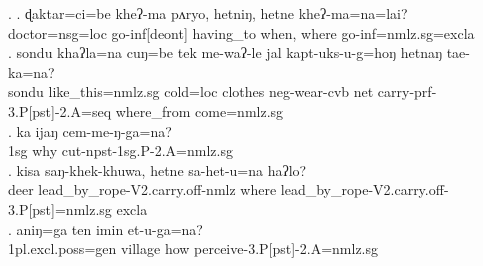  \ex. \ag. ɖaktar=ci=be       kheʔ-ma           pʌryo, hetniŋ,  hetne  kheʔ-ma=na=lai?\\
 doctor{\sc =nsg=loc} go{\sc -inf[deont]} having\_to when, where go{\sc -inf=nmlz.sg=excla}\\
  
 \bg. sondu  khaʔla=na cuŋ=be    tek   me-waʔ-le jal kapt-uks-u-g=hoŋ hetnaŋ    tae-ka=na?\\
 sondu like\_this{\sc =nmlz.sg} cold{\sc =loc} clothes {\sc neg-}wear{\sc -cvb} net carry{\sc -prf-3.P[pst]-2.A=seq} where\_from come{=nmlz.sg}\\
  
 \bg. ka  ijaŋ cem-me-ŋ-ga=na?\\
{\sc 1sg} why cut{\sc -npst-1sg.P-2.A=nmlz.sg}\\
 
\bg. kisa saŋ-khek-khuwa,   hetne  sa-het-u=na          haʔlo?\\
deer lead\_by\_rope{\sc -V2.carry.off-nmlz} where lead\_by\_rope{\sc -V2.carry.off-3.P[pst]=nmlz.sg}  {\sc excla}\\
 
\bg.	aniŋ=ga ten imin et-u-ga=na?\\
			{\sc 1pl.excl.poss=gen} village how perceive{\sc -3.P[pst]-2.A=nmlz.sg}\\



